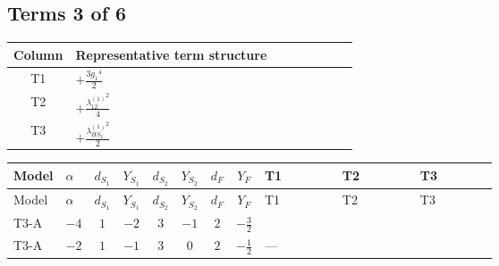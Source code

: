 \documentclass[8pt]{article}
\begin{document}
\begin{landscape}
\subsection*{Terms 3 of 6}
\begin{center}
\begin{tabular}{@{}c >{\raggedright\arraybackslash}p{0.82\linewidth}@{}}
\toprule
Column & Representative term structure \\
\midrule
T1 & \(\displaystyle +\frac{3 {g_1}^4}{2}\) \\
\midrule
T2 & \(\displaystyle +\frac{{\lambda_{12}^{(1)}}^2}{4}\) \\
\midrule
T3 & \(\displaystyle +\frac{{\lambda_{HS_2}^{(1)}}^2}{2}\) \\
\midrule
\bottomrule
\end{tabular}
\end{center}
\smallskip
\tiny
\begin{longtable}{@{}llcccccc >{\raggedright\arraybackslash}p{0.21\linewidth} >{\raggedright\arraybackslash}p{0.21\linewidth} >{\raggedright\arraybackslash}p{0.21\linewidth}@{}}
\toprule
Model & $\alpha$ & $d_{S_1}$ & $Y_{S_1}$ & $d_{S_2}$ & $Y_{S_2}$ & $d_F$ & $Y_F$ & T1 & T2 & T3 \\
\midrule
\endfirsthead
\toprule
Model & $\alpha$ & $d_{S_1}$ & $Y_{S_1}$ & $d_{S_2}$ & $Y_{S_2}$ & $d_F$ & $Y_F$ & T1 & T2 & T3 \\
\midrule
\endhead
T3-A & $-4$ & $1$ & $-2$ & $3$ & $-1$ & $2$ & $-\frac{3}{2}$ & \scriptsize\adjustbox{max width=\linewidth}{$\begin{gathered} +\frac{3 {g_1}^4}{2}\end{gathered}$} & \scriptsize\adjustbox{max width=\linewidth}{$\begin{gathered} +\frac{{\lambda_{12}^{(1)}}^2}{4}\end{gathered}$} & \scriptsize\adjustbox{max width=\linewidth}{$\begin{gathered} +\frac{{\lambda_{HS_2}^{(1)}}^2}{2}\end{gathered}$} \\
\midrule
T3-A & $-2$ & $1$ & $-1$ & $3$ & $0$ & $2$ & $-\frac{1}{2}$ & --- & \scriptsize\adjustbox{max width=\linewidth}{$\begin{gathered} +\frac{{\lambda_{12}^{(1)}}^2}{4}\end{gathered}$} & \scriptsize\adjustbox{max width=\linewidth}{$\begin{gathered} +\frac{{\lambda_{HS_2}^{(1)}}^2}{2}\end{gathered}$} \\

\end{longtable}
\end{landscape}
\end{document}
